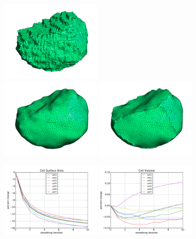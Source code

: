 \documentclass[a4paper,10pt]{article}
\begin{document}
\begin{figure}[H]
\begin{center}
\includegraphics[width=0.45\textwidth]{images/cell1-00_crop.png}\\
\includegraphics[width=0.45\textwidth]{images/cell1N-10_crop.png}
\includegraphics[width=0.45\textwidth]{images/cell1-10_crop.png}
\end{center}
\end{figure}

\begin{figure}[H]
\begin{center}
\includegraphics[width=0.45\textwidth]{images/cell_surf.pdf}
\includegraphics[width=0.45\textwidth]{images/cell_vol.pdf}
\end{center}
\end{figure}
\end{document}
